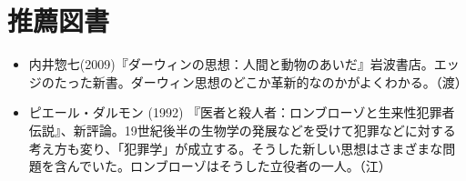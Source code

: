 \vspace{2zw}
\section{推薦図書}



\begin{itemize}
\item 内井惣七(2009)『ダーウィンの思想：人間と動物のあいだ』岩波書店。エッジのたった新書。ダーウィン思想のどこか革新的なのかがよくわかる。（渡）
\item ピエール・ダルモン (1992) 『医者と殺人者：ロンブローゾと生来性犯罪者伝説』、新評論。19世紀後半の生物学の発展などを受けて犯罪などに対する考え方も変り、「犯罪学」が成立する。そうした新しい思想はさまざまな問題を含んでいた。ロンブローゾはそうした立役者の一人。（江）
\end{itemize}



